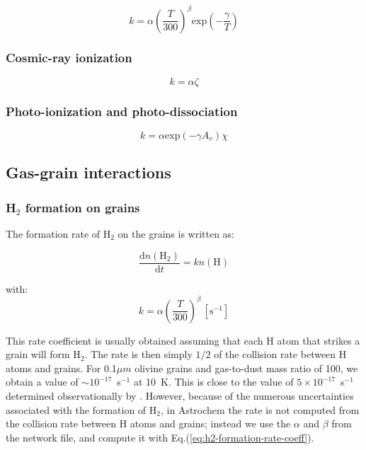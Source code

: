 \documentclass[a4paper,12pt]{article}
\newcommand{\conc}[1]{n(\mathrm{#1})}
\begin{document}
{\begin{equation}
  k = \alpha  \left( \frac{T}{300} \right)^\beta  \mathrm{exp} \left(
    -\frac{\gamma}{T} \right)
  \label{eq:arrhenius}
\end{equation}

\subsubsection{Cosmic-ray ionization}
\label{sec:cosm-ray-ioniz}

\begin{equation}
  k = \alpha  \zeta
  \label{eq:cosmic-ray-ionization}
\end{equation}

\subsubsection{Photo-ionization and photo-dissociation}
\label{sec:photo-ioniz-photo}

\begin{equation}
  k = \alpha \mathrm{exp} \left( -\gamma A_{v} \right) \chi
  \label{eq:photo-ionization}
\end{equation}

\subsection{Gas-grain interactions}
\label{sec:gas-grain-inter}

\subsubsection{H$_{2}$ formation on grains}
\label{sec:h_2-formation-grains}

The formation rate of H$_{2}$ on the grains is written as:

\begin{equation}
  \frac{\mathrm{d} \conc{H_{2}}}{\mathrm{d} t} = k \conc{H}
  \label{eq:h2-formation-rate}
\end{equation}

\noindent
with:
\begin{equation}
  k = \alpha  \left( \frac{T}{300} \right)^\beta \, [\mathrm{s}^{-1}]
  \label{eq:h2-formation-rate-coeff}
\end{equation}

This rate coefficient is usually obtained assuming that each H atom
that strikes a grain will form H$_{2}$. The rate is then simply $1/2$
of the collision rate between H atoms and grains. For 0.1$\mu m$
olivine grains and gas-to-dust mass ratio of 100, we obtain a value of
$\sim 10^{-17}$~s$^{-1}$ at 10~K. This is close to the value of $5
\times 10^{-17}$~s$^{-1}$ determined observationally by
\citet{Jura74}. However, because of the numerous uncertainties
associated with the formation of H$_{2}$, in Astrochem the rate is not
computed from the collision rate between H atoms and grains; instead
we use the $\alpha$ and $\beta$ from the network file, and compute it
with Eq.(\ref{eq:h2-formation-rate-coeff}).

}
\end{document}
